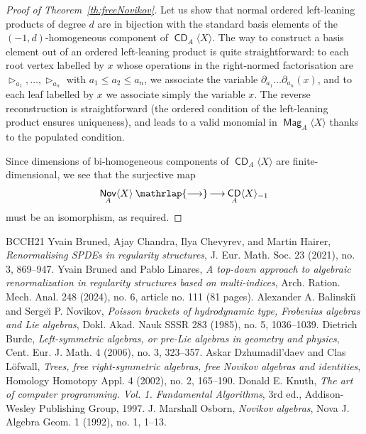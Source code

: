 \documentclass[10pt,a4paper]{article}
\theoremstyle{definition}
\numberwithin{equation}{section}
\numberwithin{figure}{section}
\DeclareMathOperator{\CDi}{\mathsf{CD}}
\DeclareMathOperator{\Nov}{\mathsf{Nov}}
\DeclareMathOperator{\Mag}{\mathsf{Mag}}
\renewcommand*{\to}{\mathchoice{\longrightarrow}{\rightarrow}{\rightarrow}{\rightarrow}}
\newcommand*{\twoheadto}{\mathbin{\mathrlap{\to}\mkern -2mu\to}}
\begin{document}
\begin{proof}[{Proof of Theorem~\ref{th:freeNovikov}}]
Let us show that normal ordered left-leaning products of degree $d$ are in bijection with the standard basis elements of the $(-1,d)$-homogeneous component of $\CDi_A\langle X\rangle$. The way to construct a basis element out of an ordered left-leaning product is quite straightforward: to each root vertex labelled by $x$ whose operations in the right-normed factorisation are $\triangleright_{a_1},\dots, \triangleright_{a_n}$ with $a_1\le a_2\le a_n$, we associate the variable $\partial_{a_1}\dots\partial_{a_n}(x)$, and to each leaf labelled by $x$ we associate simply the variable $x$. The reverse reconstruction is straightforward (the ordered condition of the left-leaning product ensures uniqueness), and leads to a valid monomial in $\Mag_A\langle X\rangle$ thanks to the populated condition.

Since dimensions of bi-homogeneous components of $\CDi_A\langle X\rangle$ are finite-dimensional, we see that the surjective map
\[
\Nov_A\langle X\rangle\twoheadto\CDi_A\langle X\rangle_{-1}
\]
must be an isomorphism, as required.
\end{proof}

\begin{thebibliography}{BCCH21}
 Yvain Bruned, Ajay Chandra, Ilya Chevyrev, and Martin Hairer, \emph{Renormalising SPDEs in regularity structures}, J. Eur. Math. Soc. 23 (2021), no. 3, 869--947.
 Yvain Bruned and Pablo Linares, \emph{A top-down approach to algebraic renormalization in regularity structures based on multi-indices}, Arch. Ration. Mech. Anal. 248 (2024), no. 6, article no. 111 (81 pages).
 Alexander A. Balinski\u\i{} and Serge\u\i{} P. Novikov, \emph{Poisson brackets of hydrodynamic type, Frobenius algebras and Lie algebras}, Dokl. Akad. Nauk SSSR 283 (1985), no. 5, 1036--1039.
 Dietrich Burde, \emph{Left-symmetric algebras, or pre-Lie algebras in geometry and physics}, Cent. Eur. J. Math. 4 (2006), no. 3, 323--357.
 Askar Dzhumadil'daev and Clas L\"ofwall, \emph{Trees, free right-symmetric algebras, free Novikov algebras and identities}, Homology Homotopy Appl. 4 (2002), no. 2, 165--190.
 Donald E. Knuth, \emph{The art of computer programming. Vol. 1. Fundamental Algorithms}, 3rd ed., Addison-Wesley Publishing Group, 1997.
 J. Marshall Osborn, \emph{Novikov algebras}, Nova J. Algebra Geom. 1 (1992), no. 1, 1--13.
\end{thebibliography}
\end{document}
